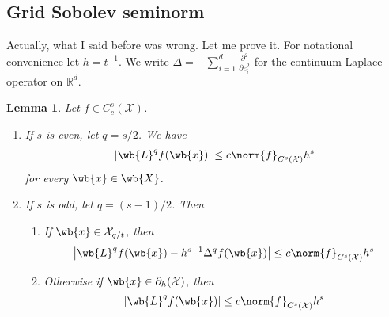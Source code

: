 \documentclass{article}
\newcommand{\Reals}{\mathbb{R}}
\newcommand{\abs}[1]{\left \lvert #1 \right \rvert}
\newcommand{\1}{\mathbf{1}}
\newcommand{\Rd}{\Reals^d}
\newcommand{\Xset}{\mathcal{X}}
\theoremstyle{alden}
\theoremstyle{aldenthm}
\newtheorem{lemma}{Lemma}
\theoremstyle{definition}
\theoremstyle{remark}
\begin{document}
\subsection{Grid Sobolev seminorm}

Actually, what I said before was wrong. Let me prove it.  For notational convenience let $h = t^{-1}$. We write $\Delta = -\sum_{i = 1}^{d} \frac{\partial^2}{\partial e_i^2}$ for the continuum Laplace operator on $\Rd$.

\begin{lemma} 
	\label{lem:grid_sobolev_seminorm}
	Let $f \in C_c^s(\Xset)$.
	\begin{enumerate}
		\item If $s$ is even, let $q = s/2$. We have
		\begin{equation}
		\label{eqn:grid_sobolev_seminorm_1}
		\abs{\wb{L}^qf(\wb{x})} \leq c \norm{f}_{C^s(\Xset)} h^s
		\end{equation}
		for every $\wb{x} \in \wb{X}$.
		\item If $s$ is odd, let $q = (s - 1)/2$. Then
		\begin{enumerate}
			\item If $\wb{x} \in \Xset_{q/t}$, then
			\begin{equation}
			\label{eqn:grid_sobolev_seminorm_2}
			\abs{\wb{L}^qf(\wb{x}) - h^{s - 1} \Delta^q f(\wb{x})} \leq c \norm{f}_{C^s(\Xset)} h^s
			\end{equation}
			\item Otherwise if $\wb{x} \in \partial_{h}(\Xset)$, then
			\begin{equation*}
			\abs{\wb{L}^qf(\wb{x})} \leq c \norm{f}_{C^s(\Xset)} h^s
			\end{equation*}
		\end{enumerate} 
	\end{enumerate}
\end{lemma}
\end{document}

